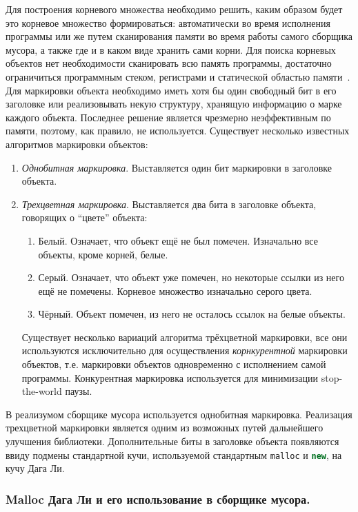 Для построения корневого множества необходимо решить, каким образом будет это корневое множество формироваться:
автоматически во время исполнения программы или же путем сканирования памяти
во время работы самого сборщика мусора, а также где и в каком виде хранить сами корни.
Для поиска корневых объектов нет необходимости сканировать всю память программы, достаточно ограничиться
программным стеком, регистрами и статической областью памяти~\cite{myCoursePaper}.
Для маркировки объекта необходимо иметь хотя бы один свободный бит в его заголовке или реализовывать некую структуру,
хранящую информацию о марке каждого объекта. Последнее решение является чрезмерно неэффективным по памяти, поэтому,
как правило, не используется. Существует несколько известных алгоритмов маркировки объектов:
\begin{enumerate}
\item \textit{Однобитная маркировка}. Выставляется один бит маркировки в заголовке объекта.
\item \textit{Трехцветная маркировка}. Выставляется два бита в заголовке объекта, говорящих о ``цвете'' объекта:
	\begin{enumerate}
	\item Белый. Означает, что объект ещё не был помечен. Изначально все объекты, кроме корней, белые.
	\item Серый. Означает, что объект уже помечен, но некоторые ссылки из него ещё не помечены. Корневое множество
		изначально серого цвета.
	\item Чёрный. Объект помечен, из него не осталось ссылок на белые объекты.
	\end{enumerate}
Существует несколько вариаций алгоритма трёхцветной маркировки, все они используются
исключительно для осуществления \textit{корнкурентной} маркировки объектов, т.е. маркировки объектов одновременно
с исполнением самой программы. Конкурентная маркировка используется для минимизации stop-the-world паузы.
\end{enumerate}
В реализумом сборщике мусора используется однобитная маркировка.
Реализация трехцветной маркировки является одним из возможных путей дальнейшего улучшения библиотеки.
Дополнительные биты в заголовке объекта появляются ввиду подмены стандартной кучи, используемой стандартным
\lstinline[language= cpp]{malloc} и \lstinline[language= cpp]{new}, на кучу Дага Ли.

\subsubsection{Malloc Дага Ли и его использование в сборщике мусора.}

